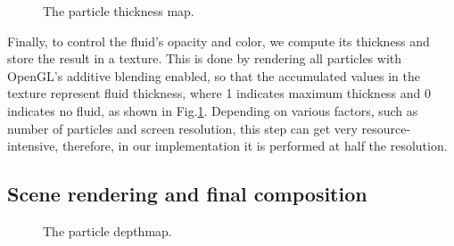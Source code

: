 \begin{figure}[ht!]
    \centering
    \caption{The particle thickness map.}\label{fig:thicknessmap}
\end{figure}
\noindent
Finally, to control the fluid's opacity and color, we compute its thickness and store the result in a texture. This is done by rendering all particles with OpenGL's additive blending enabled, so that the accumulated values in the texture represent fluid thickness, where 1 indicates maximum thickness and 0 indicates no fluid, as shown in Fig.\ref{fig:thicknessmap}. Depending on various factors, such as number of particles and screen resolution, this step can get very resource-intensive, therefore, in our implementation it is performed at half the resolution.

\subsection{Scene rendering and final composition}
\begin{figure}[ht!]
    \centering
        \hfill
    \caption{The particle depthmap.}\label{fig:finalRenders}
\end{figure}

